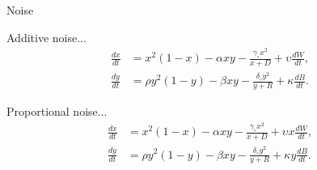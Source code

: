 \begin{frame}{Noise}

  Additive noise...
  \begin{align*}
    \frac{dx}{dt} &= x^2 (1-x) - \alpha xy - \frac{\gamma_\circ x^2}{x+D} + \upsilon \frac{dW}{dt}, \\
    \frac{dy}{dt} &= \rho y^2 (1-y) - \beta xy -\frac{\delta_\circ y^2}{y+R}+ \kappa \frac{dB}{dt}.
  \end{align*}

  Proportional noise...
  \begin{align*}
    \frac{dx}{dt} &= x^2 (1-x) - \alpha xy - \frac{\gamma_\circ x^2}{x+D} + \upsilon x \frac{dW}{dt}, \\
    \frac{dy}{dt} &= \rho y^2 (1-y) - \beta xy -\frac{\delta_\circ y^2}{y+R}+ \kappa y \frac{dB}{dt}.
  \end{align*}

\end{frame}


%
%
%
%
%
%

